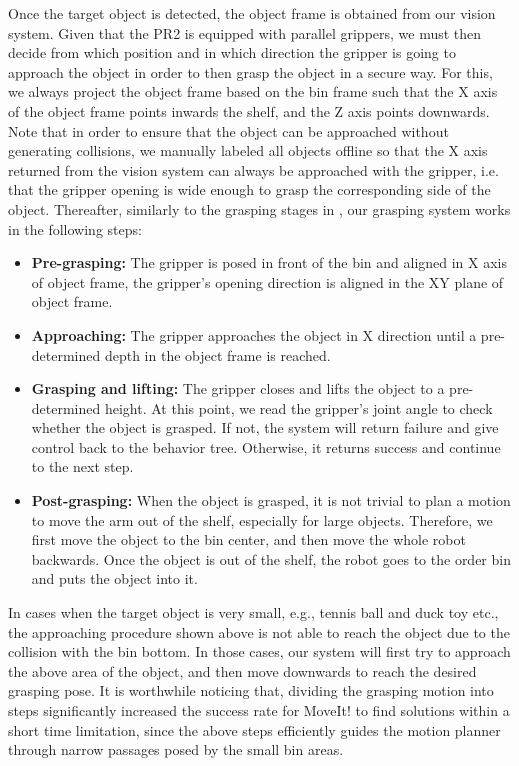 Once the target object is detected, the object frame is obtained from our vision system. Given that the PR2 is equipped with parallel grippers, we must then decide from which position and in which direction the gripper is going to approach the object in order to then grasp the object
in a secure way. For this, we always project the object frame based on the bin frame such that the X axis of the object frame points inwards the shelf, and the Z axis points downwards. Note that in order to ensure that the object can be approached without generating collisions,
we manually labeled all objects offline so that the X axis returned from the vision system can always be approached with the gripper, i.e. that the gripper opening is wide enough to grasp the corresponding side of the object. Thereafter, similarly to the grasping stages in \cite{hang2016b}, our grasping system works in the following steps:
\begin{itemize}
 \item \textbf{Pre-grasping:} The gripper is posed in front of the bin and aligned in X axis of object frame, the gripper's opening direction is aligned in the XY plane of object frame.
 \item \textbf{Approaching:} The gripper approaches the object in X direction until a pre-determined depth in the object frame is reached.
 \item \textbf{Grasping and lifting:} The gripper closes and lifts the object to a pre-determined height. At this point, we read the gripper's joint angle to check whether the object is grasped. If not, the system will return failure and give control back to the behavior tree. Otherwise, it returns success and continue to the next step.
 \item \textbf{Post-grasping:} When the object is grasped, it is not trivial to plan a motion to move the arm out of the shelf, especially for large objects. Therefore, we first move the object to the bin center, and then move the whole robot backwards. Once the object is out of the shelf, the robot goes to the order bin and puts the object into it.
\end{itemize}
In cases when the target object is very small, e.g., tennis ball and duck toy etc., the approaching procedure shown above is not able to reach the object due to the collision with the bin bottom. In those cases, our system will first try to approach the above area of the object, and then move downwards to reach the desired grasping pose. It is worthwhile noticing that, dividing the grasping motion into steps significantly increased the success rate for MoveIt! to find solutions within a short time limitation, since the above steps efficiently guides the motion planner through narrow passages posed by the small bin areas. 

